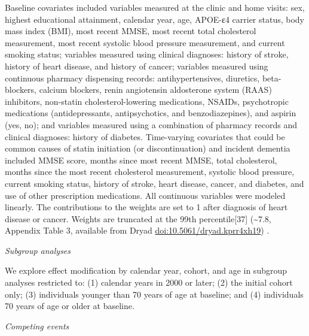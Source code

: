 \documentclass[
]{book}
\begin{document}
Baseline covariates included variables measured at the clinic and home visits: sex, highest educational attainment, calendar year, age, APOE-ε4 carrier status, body mass index (BMI), most recent MMSE, most recent total cholesterol measurement, most recent systolic blood pressure measurement, and current smoking status; variables measured using clinical diagnoses: history of stroke, history of heart disease, and history of cancer; variables measured using continuous pharmacy dispensing records: antihypertensives, diuretics, beta-blockers, calcium blockers, renin angiotensin aldosterone system (RAAS) inhibitors, non-statin cholesterol-lowering medications, NSAIDs, psychotropic medications (antidepressants, antipsychotics, and benzodiazepines), and aspirin (yes, no); and variables measured using a combination of pharmacy records and clinical diagnoses: history of diabetes. Time-varying covariates that could be common causes of statin initiation (or discontinuation) and incident dementia included MMSE score, months since most recent MMSE, total cholesterol, months since the most recent cholesterol measurement, systolic blood pressure, current smoking status, history of stroke, heart disease, cancer, and diabetes, and use of other prescription medications. All continuous variables were modeled linearly. The contributions to the weights are set to 1 after diagnosis of heart disease or cancer. Weights are truncated at the 99th percentile{[}37{]} (\textasciitilde7.8, Appendix Table 3, available from Dryad \url{doi:10.5061/dryad.kprr4xh19}) .

\emph{Subgroup analyses}

We explore effect modification by calendar year, cohort, and age in subgroup analyses restricted to: (1) calendar years in 2000 or later; (2) the initial cohort only; (3) individuals younger than 70 years of age at baseline; and (4) individuals 70 years of age or older at baseline.

\emph{Competing events}
\end{document}
